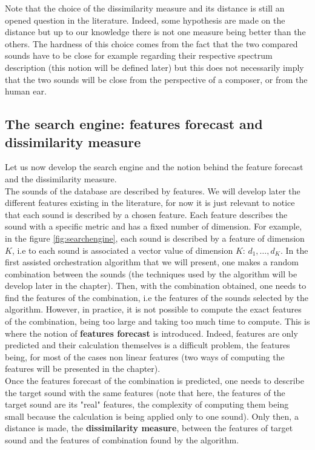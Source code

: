 \documentclass[a4paper]{book}
\begin{document}
Note that the choice of the dissimilarity measure and its distance is still an opened question in the literature. Indeed, some hypothesis are made on the distance but up to our knowledge there is not one measure being better than the others. The hardness of this choice comes from the fact that the two compared sounds have to be close for example regarding their respective spectrum description (this notion will be defined later) but this does not necessarily imply that the two sounds will be close from the perspective of a composer, or from the human ear. 

\subsection{The search engine: features forecast and dissimilarity measure}
Let us now develop the search engine and the notion behind the feature forecast and the dissimilarity measure. \\

The sounds of the database are described by features. We will develop later the different features existing in the literature, for now it is just relevant to notice that each sound is described by a chosen feature. Each feature describes the sound with a specific metric and has a fixed number of dimension. For example, in the figure \ref{fig:searchengine}, each sound is described by a feature of dimension $K$, i.e to each sound is associated a vector value of dimension $K$: $d_1, \ldots, d_K$. In the first assisted orchestration algorithm that we will present, one makes a random combination between the sounds (the techniques used by the algorithm will be develop later in the chapter). Then, with the combination obtained, one needs to find the features of the combination, i.e the features of the sounds selected by the algorithm. However, in practice, it is not possible to compute the exact features of the combination, being too large and taking too much time to compute. This is where the notion of \textbf{features forecast} is introduced. Indeed, features are only predicted and their calculation themselves is a difficult problem, the features being, for most of the cases non linear features (two ways of computing the features will be presented in the chapter). \\
Once the features forecast of the combination is predicted, one needs to describe the target sound with the same features (note that here, the features of the target sound are its "real" features, the complexity of computing them being small because the calculation is being applied only to one sound). Only then, a distance is made, the \textbf{dissimilarity measure}, between the features of target sound and the features of combination found by the algorithm. \\
\end{document}
